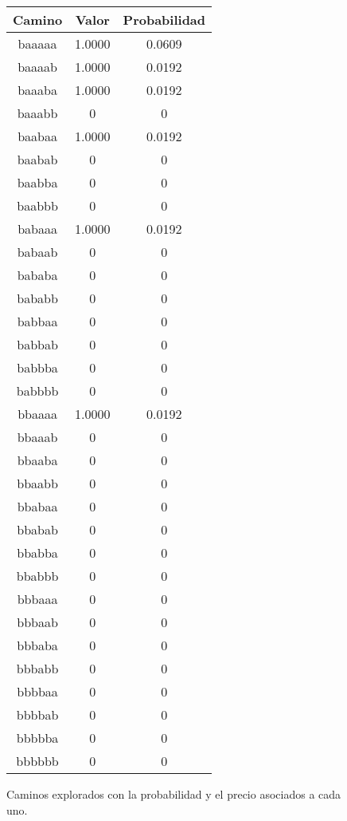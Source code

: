 \begin{figure}[hbpt]
\begin{minipage}{0.48\textwidth}
\begin{center}
\begin{tabular}{|c|c|c|}
\hline
\textbf{Camino} & \textbf{Valor} & \textbf{Probabilidad} \\
\hline
baaaaa  &  1.0000  &  0.0609  \\
baaaab  &  1.0000  &  0.0192  \\
baaaba  &  1.0000  &  0.0192  \\
baaabb  & 0 & 0 \\
baabaa  &  1.0000  &  0.0192  \\
baabab  & 0 & 0 \\
baabba  & 0 & 0 \\
baabbb  & 0 & 0 \\
babaaa  &  1.0000  &  0.0192  \\
babaab  & 0 & 0 \\
bababa  & 0 & 0 \\
bababb  & 0 & 0 \\
babbaa  & 0 & 0 \\
babbab  & 0 & 0 \\
babbba  & 0 & 0 \\
babbbb  & 0 & 0 \\
bbaaaa  &  1.0000  &  0.0192  \\
bbaaab  & 0 & 0 \\
bbaaba  & 0 & 0 \\
bbaabb  & 0 & 0 \\
bbabaa  & 0 & 0 \\
bbabab  & 0 & 0 \\
bbabba  & 0 & 0 \\
bbabbb  & 0 & 0 \\
bbbaaa  & 0 & 0 \\
bbbaab  & 0 & 0 \\
bbbaba  & 0 & 0 \\
bbbabb  & 0 & 0 \\
bbbbaa  & 0 & 0 \\
bbbbab  & 0 & 0 \\
bbbbba  & 0 & 0 \\
bbbbbb  & 0 & 0 \\

\hline
\end{tabular}
\end{center}
\end{minipage}
\caption{Caminos explorados con la probabilidad y el precio asociados a cada uno.}
\label{fig:2_4a}
\end{figure}


